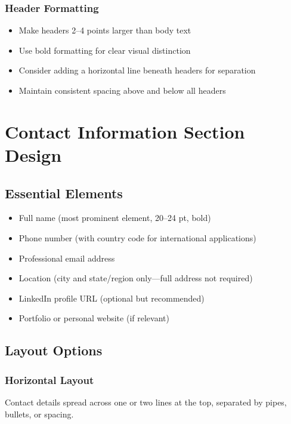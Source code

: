 \documentclass[11pt,a4paper]{article}
\begin{document}
\subsubsection{Header Formatting}

\begin{itemize}
    \item Make headers 2--4 points larger than body text
    \item Use bold formatting for clear visual distinction
    \item Consider adding a horizontal line beneath headers for separation
    \item Maintain consistent spacing above and below all headers
\end{itemize}

\section{Contact Information Section Design}

\subsection{Essential Elements}

\begin{itemize}
    \item Full name (most prominent element, 20--24 pt, bold)
    \item Phone number (with country code for international applications)
    \item Professional email address
    \item Location (city and state/region only---full address not required)
    \item LinkedIn profile URL (optional but recommended)
    \item Portfolio or personal website (if relevant)
\end{itemize}

\subsection{Layout Options}

\subsubsection{Horizontal Layout}

Contact details spread across one or two lines at the top, separated by pipes, bullets, or spacing.
\end{document}
